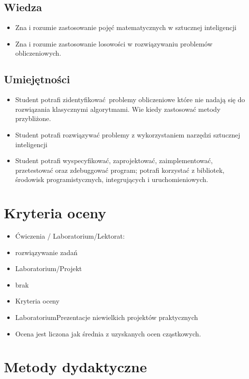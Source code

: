 \documentclass[12pt, a4paper]{article}
\begin{document}
\subsection*{Wiedza}
\begin{itemize}
  \item Zna i rozumie zastosowanie pojęć matematycznych w sztucznej inteligencji
  \item Zna i rozumie zastosowanie losowości w rozwiązywaniu problemów obliczeniowych.
\end{itemize}

\subsection*{Umiejętności}
\begin{itemize}
  \item Student potrafi zidentyfikować problemy obliczeniowe które nie nadają się do rozwiązania klasycznymi algorytmami. Wie kiedy zastosować metody przybliżone.
  \item Student potrafi rozwiązywać problemy z wykorzystaniem narzędzi sztucznej inteligencji
  \item Student potrafi wyspecyfikować, zaprojektować, zaimplementować, przetestować oraz zdebuggować program; potrafi korzystać z bibliotek, środowisk programistycznych, integrujących i uruchomieniowych.
\end{itemize}

\section{Kryteria oceny}

\begin{itemize}
  \item Ćwiczenia / Laboratorium/Lektorat:
  \item rozwiązywanie zadań
  \item Laboratorium/Projekt
  \item brak
  \item Kryteria oceny
  \item LaboratoriumPrezentacje niewielkich projektów praktycznych
  \item Ocena jest liczona jak średnia z uzyskanych ocen cząstkowych.
\end{itemize}

\section{Metody dydaktyczne}
\end{document}
